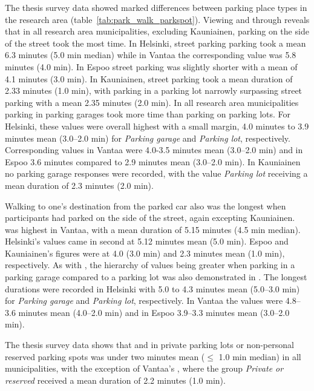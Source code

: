 The thesis survey data showed marked differences between parking place types in the research area (table~\ref{tab:park_walk_parkspot}). Viewing  and  through  reveals that in all research area municipalities, excluding Kauniainen, parking on the side of the street took the most time. In Helsinki, street parking parking took a mean 6.3 minutes (5.0 min median) while in Vantaa the corresponding value was 5.8 minutes (4.0 min). In Espoo street parking was slightly shorter with a mean of 4.1 minutes (3.0 min). In Kauniainen, street parking took a mean duration of 2.33 minutes (1.0 min), with parking in a parking lot narrowly surpassing street parking with a mean 2.35 minutes (2.0 min). In all research area municipalities parking in parking garages took more time than parking on parking lots. For Helsinki, these values were overall highest with a small margin, 4.0 minutes to 3.9 minutes mean (3.0--2.0 min) for \textit{Parking garage} and \textit{Parking lot}, respectively. Corresponding values in Vantaa were 4.0-3.5 minutes mean (3.0--2.0 min) and in Espoo 3.6 minutes compared to 2.9 minutes mean (3.0--2.0 min). In Kauniainen no parking garage responses were recorded, with the value \textit{Parking lot} receiving a mean duration of 2.3 minutes (2.0 min).

Walking to one's destination from the parked car also was the longest when participants had parked on the side of the street, again excepting Kauniainen.  was highest in Vantaa, with a mean duration of 5.15 minutes (4.5 min median). Helsinki's values came in second at 5.12 minutes mean (5.0 min). Espoo and Kauniainen's figures were at 4.0 (3.0 min) and 2.3 minutes mean (1.0 min), respectively. As with , the hierarchy of values being greater when parking in a parking garage compared to a parking lot was also demonstrated in . The longest durations were recorded in Helsinki with 5.0 to 4.3 minutes mean (5.0--3.0 min) for \textit{Parking garage} and \textit{Parking lot}, respectively. In Vantaa the values were 4.8--3.6 minutes mean (4.0--2.0 min) and in Espoo 3.9--3.3 minutes mean (3.0--2.0 min). 

The thesis survey data shows that  and  in private parking lots or non-personal reserved parking spots was under two minutes mean ($\leq$ 1.0 min median) in all municipalities, with the exception of Vantaa's , where the group \textit{Private or reserved} received a mean duration of 2.2 minutes (1.0 min).

